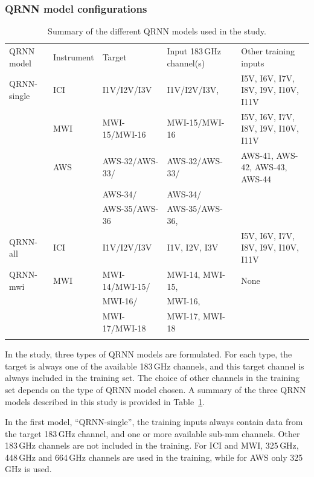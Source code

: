 \documentclass[amt, manuscript]{copernicus}
\begin{document}
\subsubsection{ QRNN model configurations}
%
\label{QRNN_models}

\begin{table}[t]
	\caption{Summary of the different QRNN models used in the study.}
	\label{tab:QRNN_models}
	\begin{tabular}{lllll}
		\tophline
		QRNN model & Instrument & Target & Input 183\,GHz channel(s) &Other training inputs \\
		\middlehline
		QRNN-single &  ICI 	& I1V/I2V/I3V 	& I1V/I2V/I3V, & I5V, I6V, I7V, I8V, I9V, I10V, I11V\\
		\cline{2-5}
		&  MWI 	& MWI-15/MWI-16 & MWI-15/MWI-16	& I5V, I6V, I7V, I8V, I9V, I10V, I11V \\
		\cline{2-5}
		& AWS	& AWS-32/AWS-33/ &  AWS-32/AWS-33/ & AWS-41, AWS-42, AWS-43, AWS-44\\
		&		& AWS-34/		 &	AWS-34/		   & \\
		&		& AWS-35/AWS-36	 & AWS-35/AWS-36,  &\\
		\cline{1-5}
		QRNN-all &  ICI 	& I1V/I2V/I3V 	& I1V, I2V, I3V & I5V, I6V, I7V, I8V, I9V, I10V, I11V\\
		\cline{1-5}
		QRNN-mwi &  MWI		& MWI-14/MWI-15/ &  MWI-14, MWI-15, & None 	\\	
		&			& MWI-16/		 &  MWI-16, & \\
		&			& MWI-17/MWI-18	 &  MWI-17, MWI-18  &\\					
		\bottomhline
	\end{tabular}
	\belowtable{} %
\end{table}						

In the study, three types of QRNN models are formulated. For each type, the target is always one of the available 183\,GHz channels, and this target channel is always included in the training set. The choice of other channels in the training set depends on the type of QRNN model chosen. A summary of the three QRNN models described in this study is provided in Table~\ref{tab:QRNN_models}.

In the first model, ``QRNN-single'', the training inputs always contain data from the target 183\,GHz channel, and one or more available sub-mm channels. Other 183\,GHz channels are not included in the training. For ICI and MWI, 325\,GHz, 448\,GHz and 664\,GHz channels are used in the training, while for AWS only 325\,GHz is used.
 
\end{document}
